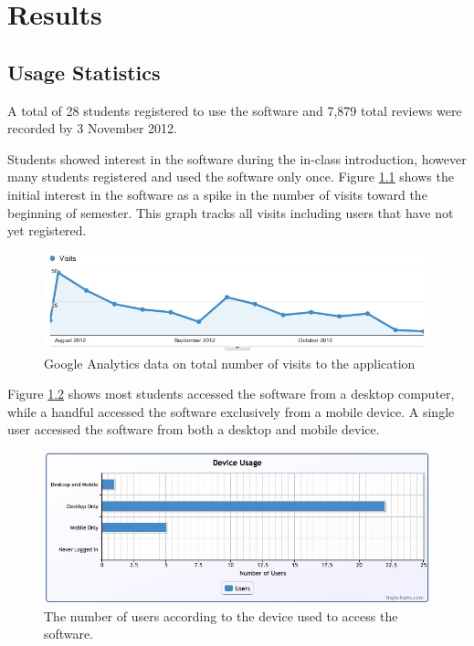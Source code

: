 \chapter{Results}
\section{Usage Statistics}

A total of 28 students registered to use the software and 7,879 total reviews were recorded
by 3 November 2012.

Students showed interest in the software during the in-class introduction, however many
students registered and used the software only once. Figure \ref{fig_visits} shows the initial
interest in the software as a spike in the number of visits toward the beginning of semester.
This graph tracks all visits including users that have not yet registered.

\begin{figure}[h!]
\includegraphics[width=12cm]{img/visits.jpg}
\caption{Google Analytics data on total number of visits to the application}
\label{fig_visits}
\end{figure}

Figure \ref{fig_usage_devices} shows most students accessed the software from a
desktop computer, while a handful accessed the
software exclusively from a mobile device. A single user accessed the software from both
a desktop and mobile device.

\begin{figure}[h!]
\includegraphics[width=12cm]{img/usage_devices.jpg}
\caption{The number of users according to the device used to access the software.}
\label{fig_usage_devices}
\end{figure}

